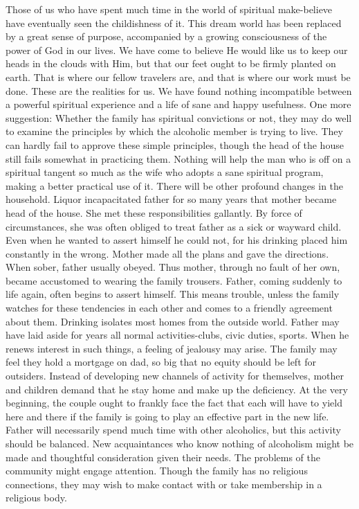 \begin{biblechapter}
Those of us who have spent much time in the world of spiritual make-believe have eventually seen the childishness of it.  This dream world has been replaced by a great sense of purpose, accompanied by a growing consciousness of the power of God in our lives.  We have come to believe He would like us to keep our heads in the clouds with Him, but that our feet ought to be firmly planted on earth.  That is where our fellow travelers are, and that is where our work must be done.  These are the realities for us.  We have found nothing incompatible between a powerful spiritual experience and a life of sane and happy usefulness.
One more suggestion:  Whether the family has spiritual convictions or not, they may do well to examine the principles by which the alcoholic member is trying to live.  They can hardly fail to approve these simple principles, though the head of the house still fails somewhat in practicing them.  Nothing will help the man who is off on a spiritual tangent so much as the wife who adopts a sane spiritual program, making a better practical use of it.
There will be other profound changes in the household.  Liquor incapacitated father for so many years that mother became head of the house.  She met these responsibilities gallantly.  By force of circumstances, she was often obliged to treat father as a sick or wayward child.  Even when he wanted to assert himself he could not, for his drinking placed him constantly in the wrong.  Mother made all the plans and gave the directions.  When sober, father usually obeyed.  Thus mother, through no fault of her own, became accustomed to wearing the family trousers.  Father, coming suddenly to life again, often begins to assert himself.  This means trouble, unless the family watches for these tendencies in each other and comes to a friendly agreement about them.
Drinking isolates most homes from the outside world.  Father may have laid aside for years all normal activities-clubs, civic duties, sports.  When he renews interest in such things, a feeling of jealousy may arise.  The family may feel they hold a mortgage on dad, so big that no equity should be left for outsiders.  Instead of developing new channels of activity for themselves, mother and children demand that he stay home and make up the deficiency.
At the very beginning, the couple ought to frankly face the fact that each will have to yield here and there if the family is going to play an effective part in the new life.  Father will necessarily spend much time with other alcoholics, but this activity should be balanced.  New acquaintances who know nothing of alcoholism might be made and thoughtful consideration given their needs.  The problems of the community might engage attention.  Though the family has no religious connections, they may wish to make contact with or take membership in a religious body.

\end{biblechapter}
